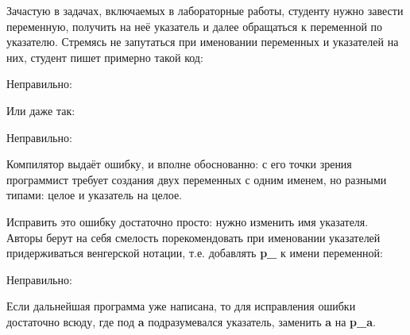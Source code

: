 \begin{typerror}
	\label{TE_same-names-for-var-and-pointer-1-right}

	Зачастую в задачах, включаемых в лабораторные работы, студенту нужно завести переменную,
	получить на неё указатель и далее обращаться к переменной по указателю.
	Стремясь не запутаться при именовании переменных и указателей на них,
	студент пишет примерно такой код:

	Неправильно:

	Или даже так:
	
	Неправильно:

	Компилятор выдаёт ошибку, и вполне обоснованно:
	с его точки зрения программист требует создания двух переменных с одним именем, но разными типами:
	целое и указатель на целое.
	
	Исправить это ошибку достаточно просто: нужно изменить имя указателя.
	Авторы берут на себя смелость порекомендовать при именовании указателей придерживаться венгерской нотации,
	т.е. добавлять \textbf{p\_} к имени переменной:

	Неправильно:
	
	Если дальнейшая программа уже написана, то для исправления ошибки достаточно всюду,
	где под \textbf{a} подразумевался указатель, заменить \textbf{a} на \textbf{p\_a}.
	
\end{typerror}
